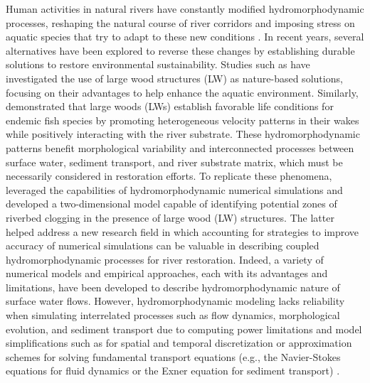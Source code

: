 \documentclass[draft,linenumbers,onecolumn]{agujournal2019} %
\begin{document}
Human activities in natural rivers have constantly modified hydromorphodynamic processes, reshaping the natural course of river corridors and imposing stress on aquatic species that try to adapt to these new conditions \cite{grooten2018living, pasternack2020river}. In recent years, several alternatives have been explored to reverse these changes by establishing durable solutions to restore environmental sustainability. Studies such as  have investigated the use of large wood structures (LW) as nature-based solutions, focusing on their advantages to help enhance the aquatic environment. Similarly,  demonstrated that large woods (LWs) establish favorable life conditions for endemic fish species by promoting heterogeneous velocity patterns in their wakes while positively interacting with the river substrate. These hydromorphodynamic patterns benefit morphological variability and interconnected processes between surface water, sediment transport, and river substrate matrix, which must be necessarily considered in restoration efforts. To replicate these phenomena,  leveraged the capabilities of hydromorphodynamic numerical simulations and developed a two-dimensional model capable of identifying potential zones of riverbed clogging in the presence of large wood (LW) structures. The latter helped address a new research field in which accounting for strategies to improve accuracy of numerical simulations can be valuable in describing coupled hydromorphodynamic processes for river restoration. Indeed, a variety of numerical models and empirical approaches, each with its advantages and limitations, have been developed to describe hydromorphodynamic nature of surface water flows. However, hydromorphodynamic modeling lacks reliability when simulating interrelated processes such as flow dynamics, morphological evolution, and sediment transport due to computing power limitations and model simplifications such as for spatial and temporal discretization or approximation schemes for solving fundamental transport equations (e.g., the Navier-Stokes equations for fluid dynamics or the Exner equation for sediment transport)  \cite{nones2019numerical,kuhanestani2022hydraulic}.
\end{document}
